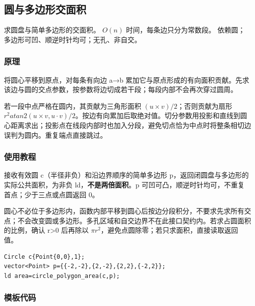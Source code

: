 \subsection{圆与多边形交面积}
\label{geo:circle-polygon}
\AlgorithmInfo
    {求圆盘与简单多边形的交面积。}
    {$O(n)$ 时间，每条边只分为常数段。}
    {依赖圆；多边形可凹、顺逆时针均可；无孔、非自交。}
\subsubsection*{原理}

将圆心平移到原点，对每条有向边 a→b 累加它与原点形成的有向面积贡献。先求该边与圆的交点参数，按参数将边切成若干段；每段内部不会再次穿过圆周。

若一段中点严格在圆内，其贡献为三角形面积 $(u\times v)/2$；否则贡献为扇形 $r^2atan2(u\times v,u\cdot v)/2$。按边有向累加后取绝对值。切分参数用投影和直线到圆心距离求出；投影点在线段内部时也加入分段，避免切点恰为中点时将整条相切边误判为圆内。重复端点直接跳过。

\subsubsection*{使用教程}
 接收有效圆 c（半径非负）和沿边界顺序的简单多边形 p，返回闭圆盘与多边形的实际公共面积，为非负 ld，\textbf{不是两倍面积}。p 可凹可凸，顺逆时针均可，不重复首点；少于三点或点圆返回 0。

圆心不必位于多边形内，函数内部平移到圆心后按边分段积分，不要求先求所有交点；不会改变圆或多边形。多孔区域和自交边界不在此接口契约内。若求占圆面积的比例，确认 r>0 后再除以 $\pi r^2$，避免点圆除零；若只求面积，直接读取返回值。
\begin{lstlisting}[style=mtycpp,numbers=none]
Circle c{Point{0,0},1};
vector<Point> p={{-2,-2},{2,-2},{2,2},{-2,2}};
ld area=circle_polygon_area(c,p);
\end{lstlisting}
\subsubsection*{模板代码}
